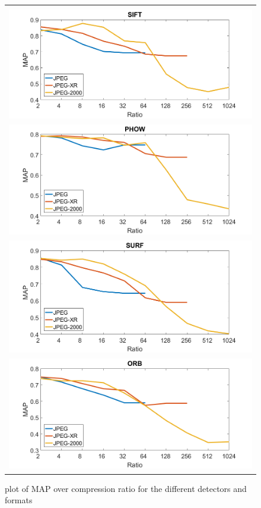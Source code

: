 \documentclass[10pt,a4paper]{article}
\begin{document}
\begin{figure}[!htp]
	\begin{tabular}{|c|}
		\hline \\
		\includegraphics[width = \textwidth]{img/sift_map.png}\\
		\includegraphics[width = \textwidth]{img/phow_map.png}\\
		\includegraphics[width = \textwidth]{img/surf_map.png}\\
		\includegraphics[width = \textwidth]{img/orb_map.png}\\
		\hline
	\end{tabular}
	\caption{plot of MAP over compression ratio for the different
	\label{fig:maps} detectors and formats}
\end{figure}


\newpage

 
\end{document}

